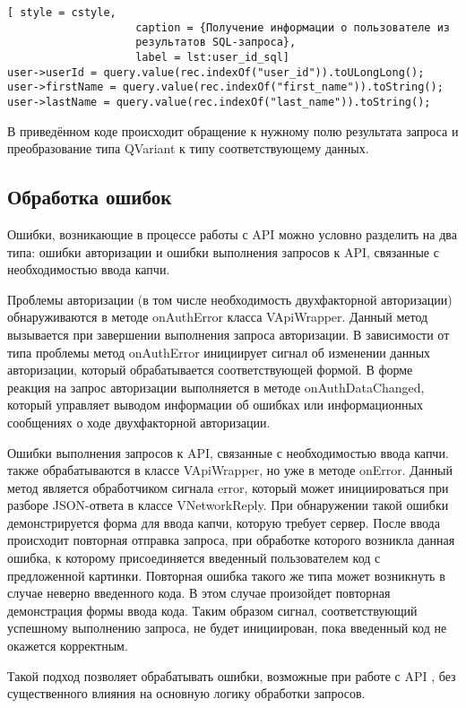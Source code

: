 \begin{lstlisting}[	style = cstyle, 
					caption = {Получение информации о пользователе из 
					результатов SQL-запроса},
					label = lst:user_id_sql]
user->userId = query.value(rec.indexOf("user_id")).toULongLong();
user->firstName = query.value(rec.indexOf("first_name")).toString();
user->lastName = query.value(rec.indexOf("last_name")).toString();
\end{lstlisting}

В приведённом коде происходит обращение к нужному полю результата запроса и
преобразование типа QVariant к типу соответствующему данных.

\subsection{Обработка ошибок}
Ошибки, возникающие в процессе работы с API \vk можно условно разделить на два
типа: ошибки авторизации и ошибки выполнения запросов к API, связанные с
необходимостью ввода капчи.

Проблемы авторизации (в том числе необходимость двухфакторной авторизации)
обнаруживаются в методе onAuthError класса VApiWrapper. Данный метод вызывается
при завершении выполнения запроса авторизации.
В зависимости от типа проблемы метод onAuthError инициирует сигнал об изменении
данных авторизации, который обрабатывается соответствующей формой. В форме
реакция на запрос авторизации выполняется в методе onAuthDataChanged, который
управляет выводом информации об ошибках или информационных сообщениях о ходе
двухфакторной авторизации.

Ошибки выполнения запросов к API, связанные с необходимостью ввода капчи.
также обрабатываются в классе VApiWrapper, но уже в методе onError. Данный метод
является обработчиком сигнала error, который может инициироваться при разборе
JSON-ответа в классе VNetworkReply. При обнаружении такой ошибки демонстрируется
форма для ввода капчи, которую требует сервер. После ввода происходит повторная
отправка запроса, при обработке которого возникла данная ошибка, к которому
присоединяется введенный пользователем код с предложенной картинки.
Повторная ошибка такого же типа может возникнуть в случае неверно введенного
кода. В этом случае произойдет повторная демонстрация формы ввода кода. Таким
образом сигнал, соответствующий успешному выполнению запроса, не будет
инициирован, пока введенный код не окажется корректным.

Такой подход позволяет обрабатывать ошибки, возможные при работе с API \vk{},
без существенного влияния на основную логику обработки запросов.
